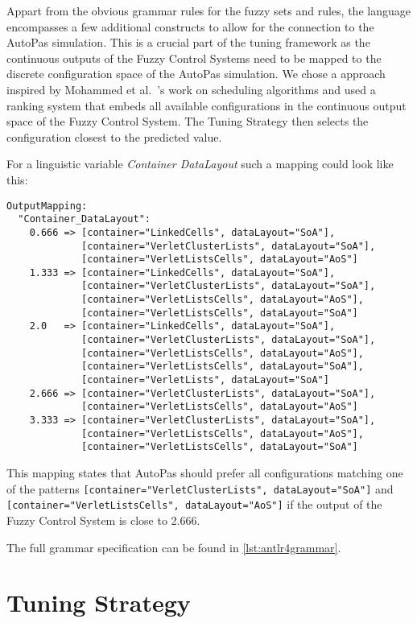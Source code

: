 Appart from the obvious grammar rules for the fuzzy sets and rules, the language encompasses a few additional constructs to allow for the connection to the AutoPas simulation. This is a crucial part of the tuning framework as the continuous outputs of the Fuzzy Control Systems need to be mapped to the discrete configuration space of the AutoPas simulation. We chose a approach inspired by Mohammed
et al.~\cite{Mohammed2022}'s work on scheduling algorithms and used a ranking system that embeds all available configurations in the continuous output space of the Fuzzy Control System. The Tuning Strategy then selects the configuration closest to the predicted value.

For a linguistic variable \emph{Container DataLayout} such a mapping could look like this:
\begin{verbatim}
OutputMapping:
  "Container_DataLayout":
    0.666 => [container="LinkedCells", dataLayout="SoA"], 
             [container="VerletClusterLists", dataLayout="SoA"],
             [container="VerletListsCells", dataLayout="AoS"]
    1.333 => [container="LinkedCells", dataLayout="SoA"], 
             [container="VerletClusterLists", dataLayout="SoA"],
             [container="VerletListsCells", dataLayout="AoS"], 
             [container="VerletListsCells", dataLayout="SoA"]
    2.0   => [container="LinkedCells", dataLayout="SoA"], 
             [container="VerletClusterLists", dataLayout="SoA"],
             [container="VerletListsCells", dataLayout="AoS"],
             [container="VerletListsCells", dataLayout="SoA"],
             [container="VerletLists", dataLayout="SoA"]
    2.666 => [container="VerletClusterLists", dataLayout="SoA"],
             [container="VerletListsCells", dataLayout="AoS"]
    3.333 => [container="VerletClusterLists", dataLayout="SoA"],
             [container="VerletListsCells", dataLayout="AoS"],
             [container="VerletListsCells", dataLayout="SoA"]
\end{verbatim}

This mapping states that AutoPas should prefer all configurations matching one of the patterns \texttt{[container="VerletClusterLists", dataLayout="SoA"]} and \texttt{[container="VerletListsCells", dataLayout="AoS"]} if the output of the Fuzzy Control System is close to 2.666.




The full grammar specification can be found in \autoref{lst:antlr4grammar}.


\section{Tuning Strategy}

